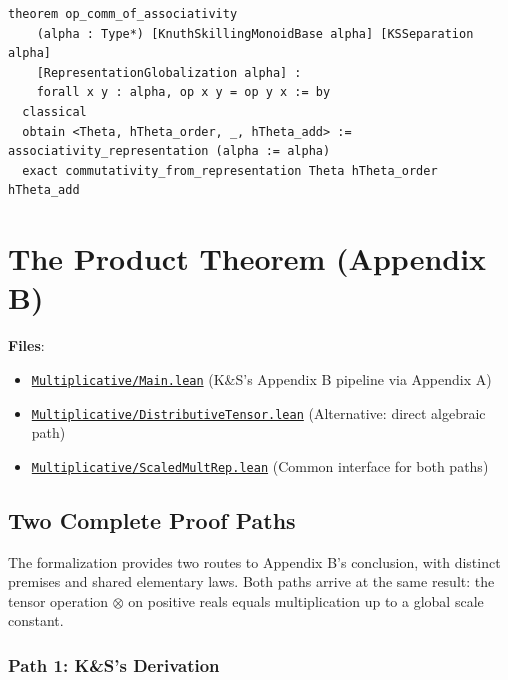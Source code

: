 \documentclass[11pt]{article}
\theoremstyle{definition}
\theoremstyle{remark}
\begin{document}
\begin{lstlisting}[caption={Commutativity from representation}]
theorem op_comm_of_associativity
    (alpha : Type*) [KnuthSkillingMonoidBase alpha] [KSSeparation alpha]
    [RepresentationGlobalization alpha] :
    forall x y : alpha, op x y = op y x := by
  classical
  obtain <Theta, hTheta_order, _, hTheta_add> := associativity_representation (alpha := alpha)
  exact commutativity_from_representation Theta hTheta_order hTheta_add
\end{lstlisting}

\section{The Product Theorem (Appendix B)}
\label{sec:product}

\textbf{Files}:
\begin{itemize}
\item \href{https://github.com/zariuq/ks-foundations-of-inference/blob/main/KnuthSkilling/Multiplicative/Main.lean}{\texttt{Multiplicative/Main.lean}} (K\&S's Appendix B pipeline via Appendix A)
\item \href{https://github.com/zariuq/ks-foundations-of-inference/blob/main/KnuthSkilling/Multiplicative/DistributiveTensor.lean}{\texttt{Multiplicative/DistributiveTensor.lean}} (Alternative: direct algebraic path)
\item \href{https://github.com/zariuq/ks-foundations-of-inference/blob/main/KnuthSkilling/Multiplicative/ScaledMultRep.lean}{\texttt{Multiplicative/ScaledMultRep.lean}} (Common interface for both paths)
\end{itemize}

\subsection{Two Complete Proof Paths}

The formalization provides two routes to Appendix B's conclusion, with distinct premises and shared elementary laws.
Both paths arrive at the same result: the tensor operation $\otimes$ on positive reals equals
multiplication up to a global scale constant.

\subsubsection{Path 1: K\&S's Derivation}
\end{document}
